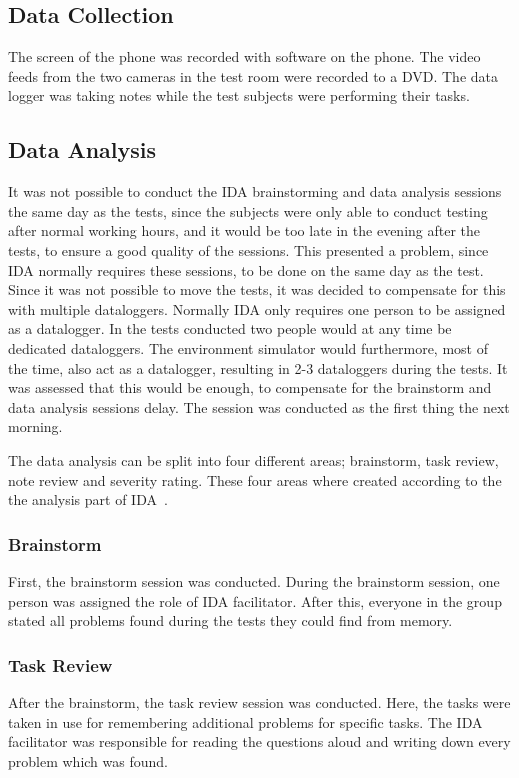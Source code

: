\subsection{Data Collection}
The screen of the phone was recorded with software on the phone. The
video feeds from the two cameras in the test room were recorded to a
DVD. The data logger was taking notes while the test subjects were
performing their tasks.

\subsection{Data Analysis}
It was not possible to conduct the IDA brainstorming and data analysis
sessions the same day as the tests, since the subjects were only able
to conduct testing after normal working hours, and it would be too
late in the evening after the tests, to ensure a good quality of the
sessions. This presented a problem, since IDA normally requires these
sessions, to be done on the same day as the test. Since it was not
possible to move the tests, it was decided to compensate for this with
multiple dataloggers. Normally IDA only requires one person to be
assigned as a datalogger. In the tests conducted two people would at
any time be dedicated dataloggers. The environment simulator would
furthermore, most of the time, also act as a datalogger, resulting in
2-3 dataloggers during the tests. It was assessed that this would be
enough, to compensate for the brainstorm and data analysis sessions
delay. The session was conducted as the first thing the next morning.

The data analysis can be split into four different areas; brainstorm, task review, note review and severity rating. These four areas where created according to the the analysis part of IDA~\cite{Kjeldskov2004}.

\subsubsection{Brainstorm}
First, the brainstorm session was conducted. During the brainstorm
session, one person was assigned the role of IDA facilitator. After this, everyone in the group stated all problems found during the tests they could find from memory.

\subsubsection{Task Review}
After the brainstorm, the task review session was conducted. Here, the
tasks were taken in use for remembering additional problems for
specific tasks. The IDA facilitator was responsible for reading the
questions aloud and writing down every problem which was found.

